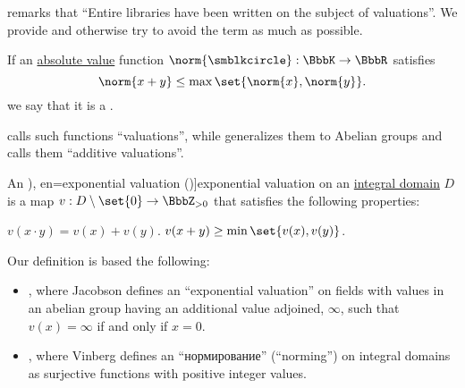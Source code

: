 remarks that \enquote{Entire libraries have been written on the subject of valuations}. We provide  and otherwise try to avoid the term as much as possible.

\begin{definition}\label{def:non_archimedean_absolute_value}
  If an \hyperref[def:absolute_value]{absolute value} function \( \norm{\anon}: \BbbK \to \BbbR \) satisfies
  \begin{equation}\label{eq:def:non_archimedean_absolute_value}
    \norm{x + y} \leq \max\set{ \norm{x}, \norm{y} }.
  \end{equation}
  we say that it is a .
\end{definition}
\begin{comments}
  \item {} calls such functions \enquote{valuations}, while \cite[def. 9.4']{Jacobson1989AlgebraII} generalizes them to Abelian groups and calls them \enquote{additive valuations}.
\end{comments}

\begin{definition}\label{def:exponential_valuation}
  An \term[ru=нормирование (\cite[437]{Винберг2014Алгебра}), en=exponential valuation (\cite[def. 9.4']{Jacobson1989AlgebraII})]{exponential valuation} on an \hyperref[def:integral_domain]{integral domain} \( D \) is a map \( v: D \setminus \set{ 0 } \to \BbbZ_{>0} \) that satisfies the following properties:
  \begin{thmenum}
     \( v(x \cdot y) = v(x) + v(y) \).
     \( v(x + y) \geq \min\set{ v(x), v(y) } \).
  \end{thmenum}
\end{definition}
\begin{comments}
  \item Our definition is based the following:
  \begin{itemize}
    \item {}, where Jacobson defines an \enquote{exponential valuation} on fields with values in an abelian group having an additional value adjoined, \( \infty \), such that \( v(x) = \infty \) if and only if \( x = 0 \).

    \item {}, where Vinberg defines an \enquote{нормирование} (\enquote{norming}) on integral domains as surjective functions with positive integer values.
  \end{itemize}
\end{comments}

